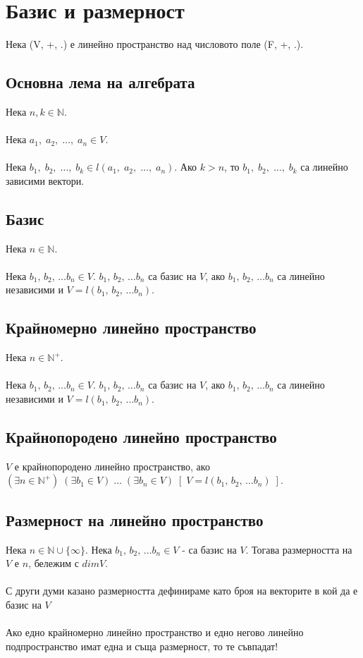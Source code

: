 \documentclass[12pt]{article}
\begin{document}
    \section{Базис и размерност}
    Нека (V, +, .) е линейно пространство над числовото поле (F, +, .).
    \subsection{Основна лема на алгебрата}
    Нека \(n, k \in \mathbb{N}\).\\\\
    Нека \(a_1, \; a_2, \; \dots, \; a_n \in V\). \\\\
    Нека \(b_1, \; b_2, \; \dots, \; b_k \in l(a_1, \; a_2, \; \dots, \; a_n)\).
    Ако \(k > n\), то \(b_1, \; b_2, \; \dots, \; b_k \) са линейно зависими вектори.
    \subsection{Базис}
    Нека \(n \in \mathbb{N}\). \\\\
    Нека \(b_1, \, b_2, \, \dots b_n \in V\).
    \(b_1, \, b_2, \, \dots b_n\) са базис на \(V\),
    ако \(b_1, \, b_2, \, \dots b_n\) са линейно независими и \(V = l(b_1, \, b_2, \, \dots b_n)\).
    \subsection{Крайномерно линейно пространство}
    Нека \(n \in \mathbb{N}^+\). \\\\
    Нека \(b_1, \, b_2, \, \dots b_n \in V\).
    \(b_1, \, b_2, \, \dots b_n\) са базис на \(V\),
    ако \(b_1, \, b_2, \, \dots b_n\) са линейно независими и \(V = l(b_1, \, b_2, \, \dots b_n)\).
    \subsection{Крайнопородено линейно пространство}
    \(V\) е крайнопородено линейно пространство, ако \\
    \((\exists n \in \mathbb{N}^+) \; (\exists b_1 \in V) \; \dots \; (\exists b_n \in V) \; [\; V = l(b_1, \, b_2, \, \dots b_n) \;] \).
    \subsection{Размерност на линейно пространство}
    Нека \(n \in \mathbb{N} \cup \{\infty\}\).
    Нека \(b_1, \, b_2, \, \dots b_n \in V\) - са базис на \(V\).
    Тогава размерността на \(V\) е  \(n\), бележим с \(dimV\). \\\\
    С други думи казано размерността дефинираме като броя на векторите в кой да е базис на \(V\) \\\\ 
    Ако едно крайномерно линейно пространство и едно негово линейно\\
    подпространство имат една и съща размерност, то те съвпадат!
\end{document}
